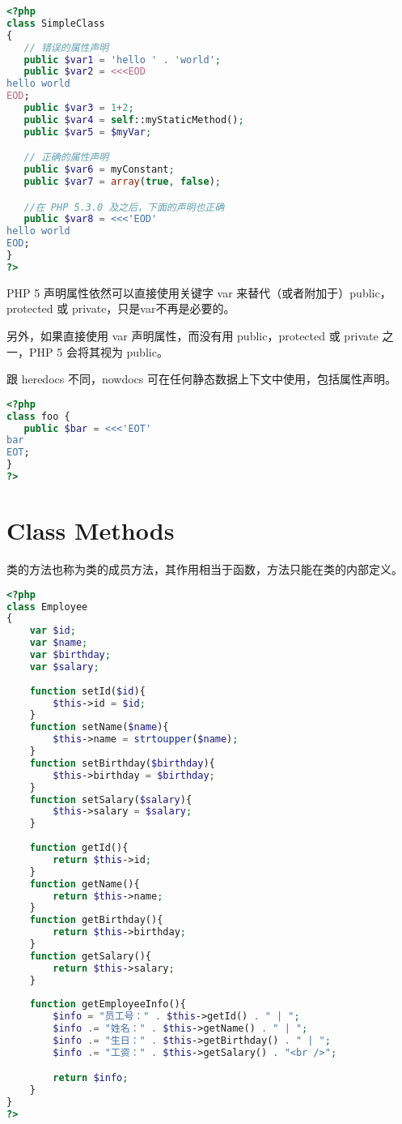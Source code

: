 \begin{lstlisting}[language=PHP]
<?php
class SimpleClass
{
   // 错误的属性声明
   public $var1 = 'hello ' . 'world';
   public $var2 = <<<EOD
hello world
EOD;
   public $var3 = 1+2;
   public $var4 = self::myStaticMethod();
   public $var5 = $myVar;

   // 正确的属性声明
   public $var6 = myConstant;
   public $var7 = array(true, false);

   //在 PHP 5.3.0 及之后，下面的声明也正确
   public $var8 = <<<'EOD'
hello world
EOD;
}
?>
\end{lstlisting}

PHP 5 声明属性依然可以直接使用关键字 var 来替代（或者附加于）public，protected 或 private，只是var不再是必要的。

另外，如果直接使用 var 声明属性，而没有用 public，protected 或 private 之一，PHP 5 会将其视为 public。

跟 heredocs 不同，nowdocs 可在任何静态数据上下文中使用，包括属性声明。

\begin{lstlisting}[language=PHP]
<?php
class foo {
   public $bar = <<<'EOT'
bar
EOT;
}
?>
\end{lstlisting}


\chapter{Class Methods}

类的方法也称为类的成员方法，其作用相当于函数，方法只能在类的内部定义。

\begin{lstlisting}[language=PHP]
<?php
class Employee
{
	var $id;
	var $name;
	var $birthday;
	var $salary;
	
	function setId($id){
		$this->id = $id;
	}
	function setName($name){
		$this->name = strtoupper($name);
	}
	function setBirthday($birthday){
		$this->birthday = $birthday;
	}
	function setSalary($salary){
		$this->salary = $salary;
	}
	
	function getId(){
		return $this->id;
	}
	function getName(){
		return $this->name;
	}
	function getBirthday(){
		return $this->birthday;
	}
	function getSalary(){
		return $this->salary;
	}
	
	function getEmployeeInfo(){
		$info = "员工号：" . $this->getId() . " | ";
		$info .= "姓名：" . $this->getName() . " | ";
		$info .= "生日：" . $this->getBirthday() . " | ";
		$info .= "工资：" . $this->getSalary() . "<br />";

		return $info;
	}
}
?>
\end{lstlisting}

